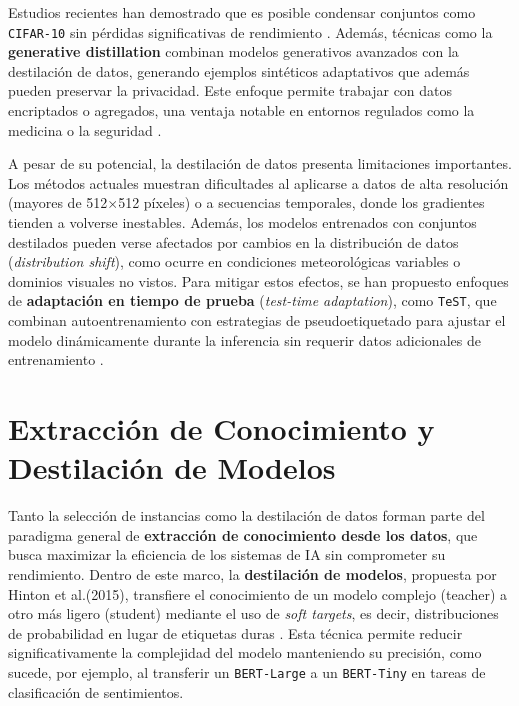 Estudios recientes han demostrado que es posible condensar conjuntos como \texttt{CIFAR-10} sin pérdidas significativas de rendimiento \cite{leiComprehensiveSurveyDataset2024}.
Además, técnicas como la \textbf{generative distillation} combinan modelos generativos avanzados con la destilación de datos, generando ejemplos sintéticos adaptativos que además pueden preservar la privacidad.
Este enfoque permite trabajar con datos encriptados o agregados, una ventaja notable en entornos regulados como la medicina o la seguridad \cite{liGenerativeDatasetDistillation2024}.

A pesar de su potencial, la destilación de datos presenta limitaciones importantes.
Los métodos actuales muestran dificultades al aplicarse a datos de alta resolución (mayores de 512$\times$512 píxeles) o a secuencias temporales, donde los gradientes tienden a volverse inestables.
Además, los modelos entrenados con conjuntos destilados pueden verse afectados por cambios en la distribución de datos (\textit{distribution shift}),
como ocurre en condiciones meteorológicas variables o dominios visuales no vistos.
Para mitigar estos efectos, se han propuesto enfoques de \textbf{adaptación en tiempo de prueba} (\textit{test-time adaptation}),
como \texttt{TeST}, que combinan autoentrenamiento con estrategias de pseudoetiquetado para ajustar el modelo dinámicamente durante la inferencia sin requerir datos adicionales de entrenamiento \cite{sinhaTeSTTesttimeSelfTraining2022}.


\section{Extracción de Conocimiento y Destilación de Modelos}
Tanto la selección de instancias como la destilación de datos forman parte del paradigma general de \textbf{extracción de conocimiento desde los datos}, que busca maximizar la eficiencia de los sistemas de IA sin comprometer su rendimiento.
Dentro de este marco, la \textbf{destilación de modelos}, propuesta por Hinton et al.(2015), transfiere el conocimiento de un modelo complejo (teacher) a otro más ligero (student) mediante el uso de \textit{soft targets}, es decir, distribuciones de probabilidad en lugar de etiquetas duras \cite{hintonDistillingKnowledgeNeural2015}.
Esta técnica permite reducir significativamente la complejidad del modelo manteniendo su precisión, como sucede, por ejemplo, al transferir un \texttt{BERT-Large} a un \texttt{BERT-Tiny} en tareas de clasificación de sentimientos.

